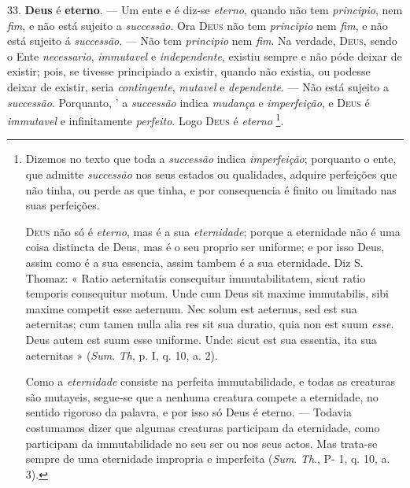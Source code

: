  33. \textbf{Deus} é \textbf{eterno}. --- Um ente e é diz-se \emph{eterno}, quando não tem \emph{principio}, nem \emph{fim}, e não está sujeito a \emph{successão}. Ora \textsc{Deus} não tem \emph{principio} nem \emph{fim}, e não está sujeito á \emph{successão}. --- Não tem \emph{principio} nem \emph{fim}. Na verdade, \textsc{Deus}, sendo o Ente \emph{necessario}, \emph{immutavel} e \emph{independente}, existiu sempre e não póde deixar de existir; pois, se tivesse principiado a existir, quando não existia, ou podesse deixar de existir, seria \emph{contingente}, \emph{mutavel} e \emph{dependente}. --- Não está sujeito a \emph{successão}. Porquanto, ' a \emph{successão} indica \emph{mudança} e \emph{imperfeição}, e \textsc{Deus} é \emph{immutavel} e infinitamente \emph{perfeito}. Logo \textsc{Deus} é \emph{eterno} \footnote{Dizemos no texto que toda a \emph{successão} indica \emph{imperfeição}; porquanto o ente, que admitte \emph{successão} nos seus estados ou qualidades, adquire perfeições que não tinha, ou perde as que tinha, e por consequencia é finito ou limitado nas suas perfeições.\par \textsc{Deus} não só é \emph{eterno}, mas é a sua \emph{eternidade}; porque a eternidade não é uma coisa distincta de Deus, mas é o seu proprio ser uniforme; e por isso Deus, assim como é a sua essencia, assim tambem é a sua eternidade. Diz S. Thomaz: « Ratio aeternitatis consequitur immutabilitatem, sicut ratio temporis consequitur motum. Unde cum Deus sit maxime immutabilis, sibi maxime competit esse aeternum. Nec solum est aeternus, sed est sua aeternitas; cum tamen nulla alia res sit sua duratio, quia non est suum \emph{esse}. Deus autem est suum esse uniforme. Unde: sicut est sua essentia, ita sua aeternitas » (\emph{Sum}. \emph{Th}, p. I, q. 10, a. 2).\par Como a \emph{eternidade} consiste na perfeita immutabilidade, e todas as creaturas são mutayeis, segue-se que a nenhuma creatura compete a eternidade, no sentido rigoroso da palavra, e por isso só Deus é eterno. --- Todavia costumamos dizer que algumas creaturas participam da eternidade, como participam da immutabilidade no seu ser ou nos seus actos. Mas trata-se sempre de uma eternidade impropria e imperfeita (\emph{Sum}. \emph{Th}., P- 1, q. 10, a. 3).}.

